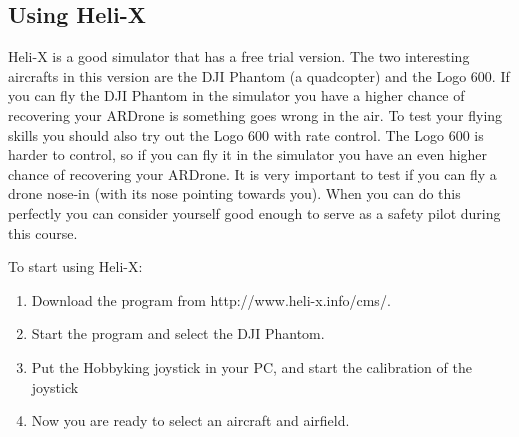 \documentclass{article}
\begin{document}
\subsection*{Using Heli-X}
Heli-X is a good simulator that has a free trial version. The two interesting aircrafts in this version are the DJI Phantom (a quadcopter) and the Logo 600. If you can fly the DJI Phantom in the simulator you have a higher chance of recovering your ARDrone is something goes wrong in the air. To test your flying skills you should also try out the Logo 600 with rate control. The Logo 600 is harder to control, so if you can fly it in the simulator you have an even higher chance of recovering your ARDrone. It is very important to test if you can fly a drone nose-in (with its nose pointing towards you). When you can do this perfectly you can consider yourself good enough to serve as a safety pilot during this course. 
 
To start using Heli-X:
\begin{enumerate}
\item Download the program from http://www.heli-x.info/cms/. 
\item Start the program and select the DJI Phantom.
\item Put the Hobbyking joystick in your PC, and start the calibration of the joystick
\item Now you are ready to select an aircraft and airfield. 
\end{enumerate}
\end{document}
